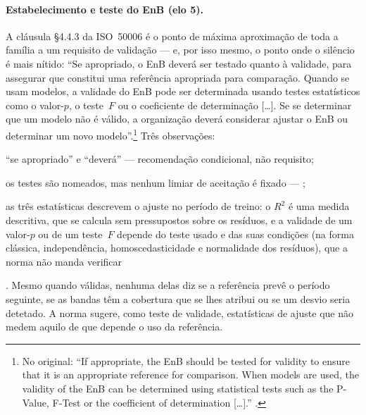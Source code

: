 \paragraph{Estabelecimento e teste do EnB (elo 5).} A cláusula \S4.4.3 da ISO~50006 é o ponto de máxima aproximação de toda a família a um requisito de validação --- e, por isso mesmo, o ponto onde o silêncio é mais nítido: \enquote{Se apropriado, o EnB deverá ser testado quanto à validade, para assegurar que constitui uma referência apropriada para comparação. Quando se usam modelos, a validade do EnB pode ser determinada usando testes estatísticos como o valor-$p$, o teste~$F$ ou o coeficiente de determinação [\ldots]. Se se determinar que um modelo não é válido, a organização deverá considerar ajustar o EnB ou determinar um novo modelo}.\footnote{No original: \enquote{If appropriate, the EnB should be tested for validity to ensure that it is an appropriate reference for comparison. When models are used, the validity of the EnB can be determined using statistical tests such as the P-Value, F-Test or the coefficient of determination [\ldots].} \cite[\S4.4.3]{ISO50006_2014}.} Três observações: \begin{enumerate*}[(i)] \item \enquote{se apropriado} e \enquote{deverá} --- recomendação condicional, não requisito; \item os testes são nomeados, mas nenhum limiar de aceitação é fixado --- ; \item as três estatísticas descrevem o ajuste no período de treino: o $R^2$ é uma medida descritiva, que se calcula sem pressupostos sobre os resíduos, e a validade de um valor-$p$ ou de um teste~$F$ depende do teste usado e das suas condições (na forma clássica, independência, homoscedasticidade e normalidade dos resíduos), que a norma não manda verificar\end{enumerate*}. Mesmo quando válidas, nenhuma delas diz se a referência prevê o período seguinte, se as bandas têm a cobertura que se lhes atribui ou se um desvio seria detetado. A norma sugere, como teste de validade, estatísticas de ajuste que não medem aquilo de que depende o uso da referência.

